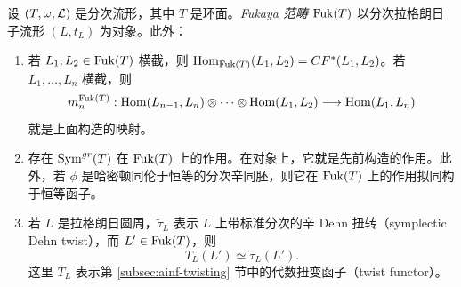 \begin{theorem}\label{thm:4.2}
设 $(T,\omega,\mathcal{L})$ 是分次流形，其中 $T$ 是环面。\emph{Fukaya 范畴} $\operatorname{Fuk}(T)$ 以分次拉格朗日子流形 $(L,t_L)$ 为对象。此外：
\begin{enumerate}[leftmargin=1.8em, itemsep=2pt, topsep=2pt]
  \item 若 $L_1,L_2\in\operatorname{Fuk}(T)$ 横截，则 $\operatorname{Hom}_{\operatorname{Fuk}(T)}(L_1,L_2)=CF^*(L_1,L_2)$。若 $L_1,\dots,L_n$ 横截，则
  \[
    m_n^{\operatorname{Fuk}(T)}: \operatorname{Hom}(L_{n-1},L_n)\otimes\cdots\otimes\operatorname{Hom}(L_1,L_2) \longrightarrow \operatorname{Hom}(L_1,L_n)
  \]
  就是上面构造的映射。
  \item 存在 $\operatorname{Sym}^{gr}(T)$ 在 $\operatorname{Fuk}(T)$ 上的作用。在对象上，它就是先前构造的作用。此外，若 $\phi$ 是哈密顿同伦于恒等的分次辛同胚，则它在 $\operatorname{Fuk}(T)$ 上的作用拟同构于恒等函子。
  \item 若 $L$ 是拉格朗日圆周，$\tilde\tau_L$ 表示 $L$ 上带标准分次的辛 Dehn 扭转（symplectic Dehn twist），而 $L'\in\operatorname{Fuk}(T)$，则
  \[
    T_L(L') \simeq \tilde\tau_L(L').
  \]
  这里 $T_L$ 表示第 \ref{subsec:ainf-twisting} 节中的代数扭变函子（twist functor）。
\end{enumerate}
\end{theorem}


